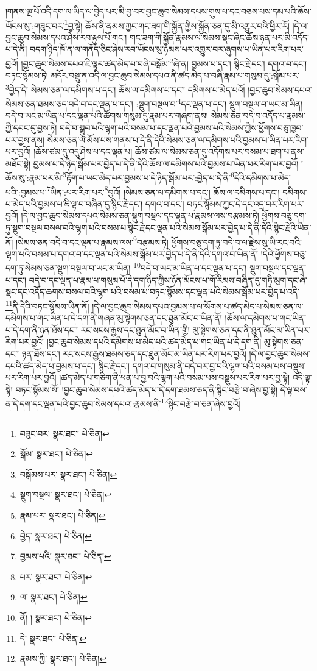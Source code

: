 །གནས་ལྔ་པོ་འདི་དག་ལ་ཡིད་ལ་བྱེད་པར་མི་བྱ་བར་བྱང་ཆུབ་སེམས་དཔས་གུས་པ་དང་བཅས་པས་དམ་པའི་ཆོས་ཡོངས་སུ་:གཟུང་བར་\footnote{བཟུང་བར་  སྣར་ཐང་།  པེ་ཅིན། }བྱ་སྟེ། ཆོས་ནི་ནམས་ཀྱང་གང་ཟག་གི་སྐྱོན་གྱིས་སྐྱོན་ཅན་དུ་མི་འགྱུར་བའི་ཕྱིར་རོ། །དེ་ལ་བྱང་ཆུབ་སེམས་དཔའ་ཤེས་རབ་རྟུལ་པོ་གང་། གང་ཟག་གི་སྐྱོན་རྣམས་ལ་སེམས་སྡང་ཞིང་ཆོས་ཉན་པར་མི་འདོད་པ་དེ་ནི། བདག་ཉིད་ཁོ་ན་ལ་གནོད་ཅིང་ཤེས་རབ་ཡོངས་སུ་ཉམས་པར་འགྱུར་བར་ཞུགས་པ་ཡིན་པར་རིག་པར་བྱའོ། །བྱང་ཆུབ་སེམས་དཔའ་ཇི་ལྟར་ཚད་མེད་པ་བཞི་བསྒོམ་\footnote{སྒོམ་  སྣར་ཐང་།  པེ་ཅིན། }ཞེ་ན། བྱམས་པ་དང་། སྙིང་རྗེ་དང་། དགའ་བ་དང་། བཏང་སྙོམས་ཏེ། མདོར་བསྡུ་ན་འདི་ལ་བྱང་ཆུབ་སེམས་དཔའ་ནི་ཚད་མེད་པ་བཞི་རྣམ་པ་གསུམ་དུ་:སྒོམ་པར་\footnote{བསྒོམས་པར་  སྣར་ཐང་།  པེ་ཅིན། }བྱེད་དེ། སེམས་ཅན་ལ་དམིགས་པ་དང་། ཆོས་ལ་དམིགས་པ་དང་། དམིགས་པ་མེད་པའོ། །བྱང་ཆུབ་སེམས་དཔའ་སེམས་ཅན་ཐམས་ཅད་བདེ་བ་དང་ལྡན་པ་དང་། :སྡུག་བསྔལ་བ་\footnote{སྡུག་བསྔལ་  སྣར་ཐང་།  པེ་ཅིན། }དང་ལྡན་པ་དང་། སྡུག་བསྔལ་བ་ཡང་མ་ཡིན། བདེ་བ་ཡང་མ་ཡིན་པ་དང་ལྡན་པའི་ཚོགས་གསུམ་དུ་རྣམ་པར་གཞག་ནས། སེམས་ཅན་བདེ་བ་འདོད་པ་རྣམས་ཀྱི་དབང་དུ་བྱས་ཏེ། བདེ་བ་སྒྲུབ་པའི་ལྷག་པའི་བསམ་པ་དང་ལྡན་པའི་བྱམས་པའི་སེམས་ཀྱིས་ཕྱོགས་བཅུ་ཁྱབ་པར་བྱས་ནས། སེམས་ཅན་ལ་མོས་པས་གནས་པ་དེ་ནི་དེའི་སེམས་ཅན་ལ་དམིགས་པའི་བྱམས་པ་ཡིན་པར་རིག་པར་བྱའོ། །ཆོས་ཙམ་དུ་འདུ་ཤེས་པ་དང་ལྡན་པ། ཆོས་ཙམ་ལ་སེམས་ཅན་དུ་འདོགས་པར་བསམ་པ་ཐག་པ་ནས་མཐོང་སྟེ། བྱམས་པ་དེ་ཉིད་སྒོམ་པར་བྱེད་པ་དེ་ནི་དེའི་ཆོས་ལ་དམིགས་པའི་བྱམས་པ་ཡིན་པར་རིག་པར་བྱའོ། །ཆོས་སུ་:རྣམ་པར་མི་\footnote{རྣམ་པར་  སྣར་ཐང་།  པེ་ཅིན། }རྟོག་པ་ཡང་མེད་པར་བྱམས་པ་དེ་ཉིད་སྒོམ་པར་:བྱེད་པ་དེ་ནི་\footnote{བྱེད་  སྣར་ཐང་།  པེ་ཅིན། }དེའི་དམིགས་པ་མེད་པའི་:བྱམས་པ་\footnote{བྱམས་པའི་  སྣར་ཐང་།  པེ་ཅིན། }ཡིན་:པར་རིག་པར་\footnote{པར་  སྣར་ཐང་།  པེ་ཅིན། }བྱའོ། །སེམས་ཅན་ལ་དམིགས་པ་དང་། ཆོས་ལ་དམིགས་པ་དང་། དམིགས་པ་མེད་པའི་བྱམས་པ་ཇི་ལྟ་བ་བཞིན་དུ་སྙིང་རྗེ་དང་། དགའ་བ་དང་། བཏང་སྙོམས་ཀྱང་དེ་དང་འདྲ་བར་རིག་པར་བྱའོ། །དེ་ལ་བྱང་ཆུབ་སེམས་དཔའ་སེམས་ཅན་སྡུག་བསྔལ་དང་ལྡན་པ་རྣམས་ལས་བརྩམས་ཏེ། ཕྱོགས་བཅུ་དག་ཏུ་སྡུག་བསྔལ་བསལ་བའི་ལྷག་པའི་བསམ་པ་སྙིང་རྗེ་དང་ལྡན་པའི་སེམས་སྒོམ་པར་བྱེད་པ་དེ་ནི་དེའི་སྙིང་རྗེའི་ཡིན་ནོ། །སེམས་ཅན་བདེ་བ་དང་ལྡན་པ་རྣམས་ལས་\footnote{ལ་  སྣར་ཐང་།  པེ་ཅིན། }བརྩམས་ཏེ། ཕྱོགས་བཅུ་དག་ཏུ་བདེ་བ་ལ་རྗེས་སུ་ཡི་རང་བའི་ལྷག་པའི་བསམ་པ་དགའ་བ་དང་ལྡན་པའི་སེམས་སྒོམ་པར་བྱེད་པ་དེ་ནི་དེའི་དགའ་བ་ཡིན་ནོ། །དེའི་ཕྱོགས་བཅུ་དག་ཏུ་སེམས་ཅན་སྡུག་བསྔལ་བ་ཡང་མ་ཡིན། \footnote{ནོ། །   སྣར་ཐང་།  པེ་ཅིན། }བདེ་བ་ཡང་མ་ཡིན་པ་དང་ལྡན་པ་དང་། སྡུག་བསྔལ་དང་ལྡན་པ་དང་། བདེ་བ་དང་ལྡན་པ་རྣམ་པ་གསུམ་པོ་དེ་དག་ཉིད་ཀྱིས་ཉོན་མོངས་པ་གོ་རིམས་བཞིན་དུ་གཏི་མུག་དང་ཞེ་སྡང་དང་འདོད་ཆགས་བསལ་བའི་ལྷག་པའི་བསམ་པ་བཏང་སྙོམས་དང་ལྡན་པའི་སེམས་སྒོམ་པར་བྱེད་པ་འདི་\footnote{དེ་  སྣར་ཐང་།  པེ་ཅིན། }ནི་དེའི་བཏང་སྙོམས་ཡིན་ནོ། །དེ་ལ་བྱང་ཆུབ་སེམས་དཔའ་བྱམས་པ་ལ་སོགས་པ་ཚད་མེད་པ་སེམས་ཅན་ལ་དམིགས་པ་གང་ཡིན་པ་དེ་དག་ནི་གཞན་མུ་སྟེགས་ཅན་དང་ཐུན་མོང་བ་ཡིན་ནོ། །ཆོས་ལ་དམིགས་པ་གང་ཡིན་པ་དེ་དག་ནི་ཉན་ཐོས་དང་། རང་སངས་རྒྱས་དང་ཐུན་མོང་བ་ཡིན་གྱི། མུ་སྟེགས་ཅན་དང་ནི་ཐུན་མོང་མ་ཡིན་པར་རིག་པར་བྱའོ། །བྱང་ཆུབ་སེམས་དཔའི་དམིགས་པ་མེད་པའི་ཚད་མེད་པ་གང་ཡིན་པ་དེ་དག་ནི། མུ་སྟེགས་ཅན་དང་། ཉན་ཐོས་དང་། རང་སངས་རྒྱས་ཐམས་ཅད་དང་ཐུན་མོང་མ་ཡིན་པར་རིག་པར་བྱའོ། །དེ་ལ་བྱང་ཆུབ་སེམས་དཔའི་ཚད་མེད་པ་བྱམས་པ་དང་། སྙིང་རྗེ་དང་། དགའ་བ་གསུམ་ནི་བདེ་བར་བྱ་བའི་ལྷག་པའི་བསམ་པས་བསྡུས་པར་རིག་པར་བྱའོ། །ཚད་མེད་པ་གཅིག་ནི་ཕན་པ་བྱ་བའི་ལྷག་པའི་བསམ་པས་བསྡུས་པར་རིག་པར་བྱ་སྟེ། འདི་ལྟ་སྟེ། བཏང་སྙོམས་སོ། །བྱང་ཆུབ་སེམས་དཔའི་ཚད་མེད་པ་དེ་དག་ཐམས་ཅད་ནི་སྙིང་བརྩེ་བ་ཞེས་བྱ་སྟེ། དེ་ལྟ་བས་ན་དེ་དག་དང་ལྡན་པའི་བྱང་ཆུབ་སེམས་དཔའ་:རྣམས་ནི་\footnote{རྣམས་ཀྱི་  སྣར་ཐང་།  པེ་ཅིན། }སྙིང་བརྩེ་བ་ཅན་ཞེས་བྱའོ། 